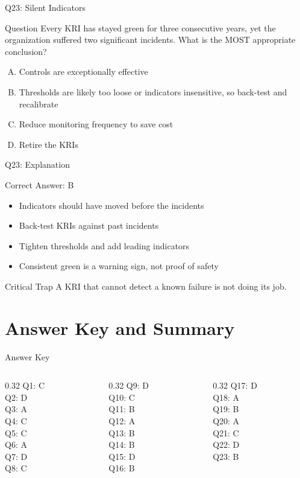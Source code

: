 \documentclass[aspectratio=169]{beamer}
\newcommand{\hq}[7]{%
	\begin{frame}{Q#1: #2}
		\begin{block}{Question}
			#3
		\end{block}
		\begin{enumerate}[(A)]
			#4
		\end{enumerate}
	\end{frame}
	\begin{frame}{Q#1: Explanation}
		\begin{block}{Correct Answer: #5}
			\begin{itemize}
				#6
			\end{itemize}
		\end{block}
		\begin{alertblock}{Critical Trap}
			#7
		\end{alertblock}
	\end{frame}
}
\begin{document}
	\hq{23}{Silent Indicators}
	{Every KRI has stayed green for three consecutive years, yet the organization suffered two significant incidents. What is the MOST appropriate conclusion?}
	{\item Controls are exceptionally effective
		\item Thresholds are likely too loose or indicators insensitive, so back-test and recalibrate
		\item Reduce monitoring frequency to save cost
		\item Retire the KRIs}
	{B}
	{\item Indicators should have moved before the incidents
		\item Back-test KRIs against past incidents
		\item Tighten thresholds and add leading indicators
		\item Consistent green is a warning sign, not proof of safety}
	{A KRI that cannot detect a known failure is not doing its job.}
	
	\section{Answer Key and Summary}
	
	\begin{frame}{Answer Key}
		\begin{columns}[T]
			\begin{column}{0.32\textwidth}
				Q1: C\\ Q2: D\\ Q3: A\\ Q4: C\\ Q5: C\\ Q6: A\\ Q7: D\\ Q8: C
			\end{column}
			\begin{column}{0.32\textwidth}
				Q9: D\\ Q10: C\\ Q11: B\\ Q12: A\\ Q13: B\\ Q14: B\\ Q15: D\\ Q16: B
			\end{column}
			\begin{column}{0.32\textwidth}
				Q17: D\\ Q18: A\\ Q19: B\\ Q20: A\\ Q21: C\\ Q22: D\\ Q23: B
			\end{column}
		\end{columns}
	\end{frame}
	
\end{document}

